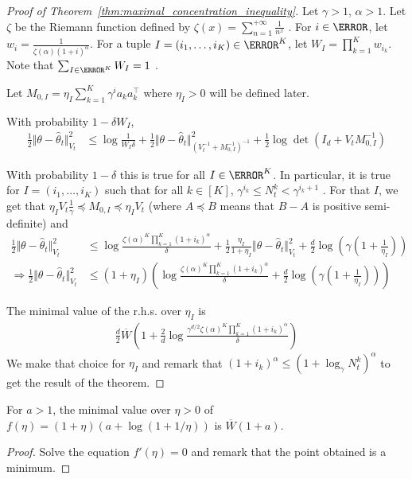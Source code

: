 \begin{proof}[Proof of Theorem~\ref{thm:maximal_concentration_inequality}]
Let $\gamma > 1$, $\alpha > 1$. Let $\zeta$ be the Riemann function defined by $\zeta(x) = \sum_{n=1}^{+\infty}\frac{1}{n^x}$ . For $i\in \N$, let $w_i = \frac{1}{\zeta(\alpha)(1+i)^\alpha}$. For a tuple $I=(i_1,\ldots,i_K)\in \N^K$, let $W_I = \prod_{k=1}^K w_{i_k}$. Note that $\sum_{I \in \N^K} W_I = 1$ .

Let $M_{0,I} = \eta_I \sum_{k=1}^K \gamma^i a_k a_k^\top$ where $\eta_I > 0$ will be defined later.

With probability $1- \delta W_I$,
\begin{align*}
\frac{1}{2} \Vert \theta - \hat{\theta}_t \Vert^2_{V_t}
&\le \log\frac{1}{W_I \delta} + \frac{1}{2} \Vert \theta - \hat{\theta}_t \Vert_{(V_t^{-1} + M_{0,I}^{-1})^{-1}}^2 + \frac{1}{2} \log \det (I_d + V_t M_{0,I}^{-1})
\end{align*}

With probability $1- \delta$ this is true for all $I \in \N^K$. In particular, it is true for $I=(i_1,\ldots,i_K)$ such that for all $k \in [K]$, $\gamma^{i_k} \le N_t^k < \gamma^{i_k+1}$ . For that $I$, we get that $\eta_I V_t \frac{1}{\gamma} \preceq M_{0,I} \preceq \eta_I V_t$ (where $A\preceq B$ means that $B-A$ is positive semi-definite) and
\begin{align*}
\frac{1}{2} \Vert \theta - \hat{\theta}_t \Vert^2_{V_t}
&\le \log\frac{\zeta(\alpha)^K\prod_{k=1}^K(1+i_k)^\alpha}{\delta} + \frac{1}{2} \frac{\eta_I}{1+\eta_I} \Vert \theta - \hat{\theta}_t \Vert_{V_t}^2 + \frac{d}{2} \log (\gamma(1 + \frac{1}{\eta_I}))
\\
\Rightarrow
\frac{1}{2} \Vert \theta - \hat{\theta}_t \Vert^2_{V_t}
&\le (1 + \eta_I)\left(\log\frac{\zeta(\alpha)^K\prod_{k=1}^K(1+i_k)^\alpha}{\delta} + \frac{d}{2} \log (\gamma(1 + \frac{1}{\eta_I})) \right)
\end{align*}

The minimal value of the r.h.s. over $\eta_I$ is
\begin{align*}
\frac{d}{2} \overline{W}\left( 1 + \frac{2}{d}\log \frac{\gamma^{d/2}\zeta(\alpha)^K\prod_{k=1}^K(1+i_k)^\alpha}{\delta} \right)
\end{align*}
We make that choice for $\eta_I$ and remark that $(1+i_k)^\alpha \le (1+\log_\gamma N_t^k)^\alpha$ to get the result of the theorem.


\end{proof}

\begin{lemma}
For $a>1$, the minimal value over $\eta>0$ of $f(\eta) = (1+\eta)(a+\log(1+1/\eta))$ is $\overline{W}(1+a)$.
\end{lemma}
\begin{proof}
Solve the equation $f'(\eta)=0$ and remark that the point obtained is a minimum.
\end{proof}

\fi
